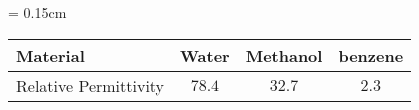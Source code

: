 \documentclass[multi=tabular]{standalone}
\begin{document}
\renewcommand{\arraystretch}{1.5}
{\tabcolsep = 0.15cm
  \begin{tabular}{lccc}
   \hline\hline
     Material              & Water & Methanol &	benzene \\
   \hline 
     Relative Permittivity & $78.4$ & $32.7$ & $2.3$ \\ 
    \hline
   \hline
  \end{tabular}
}
\renewcommand{\arraystretch}{1.0}
% 
\end{document}
